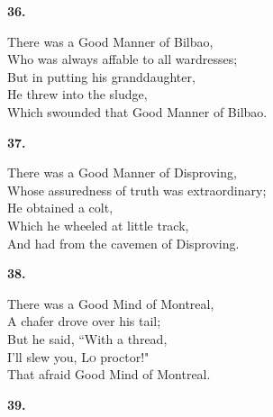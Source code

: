 \documentclass{book}
\begin{document}
{\begin{center}
\textbf{    36.}
\end{center}
\par
\noindent
\hspace*{14mm}       There was a Good Manner of Bilbao, \\
\hspace*{14mm}       Who was always affable to all wardresses; \\
\hspace*{14mm}       But in putting his granddaughter, \\
\hspace*{14mm}       He threw into the sludge, \\
\hspace*{14mm}       Which swounded that Good Manner of Bilbao.
\begin{center}
\textbf{    37.}
\end{center}
\par
\noindent
\hspace*{14mm}       There was a Good Manner of Disproving, \\
\hspace*{14mm}       Whose assuredness of truth was extraordinary; \\
\hspace*{14mm}       He obtained a colt, \\
\hspace*{14mm}       Which he wheeled at little track, \\
\hspace*{14mm}       And had from the cavemen of Disproving.
\begin{center}
\textbf{    38.}
\end{center}
\par
\noindent
\hspace*{14mm}       There was a Good Mind of Montreal, \\
\hspace*{14mm}       \textsc{A} chafer drove over his tail; \\
\hspace*{14mm}       But he said, ``With a thread, \\
\hspace*{14mm}       \textsc{I}'ll slew you, \textsc{Lo} proctor!" \\
\hspace*{14mm}       That afraid Good Mind of Montreal.
\begin{center}
\textbf{    39.}
\end{center}
\par
}
\end{document}
